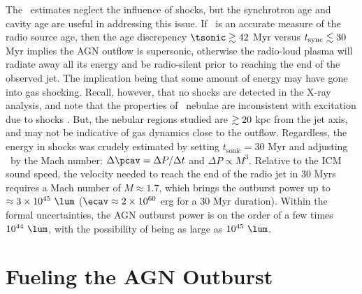 \documentclass[useAMS,usenatbib]{mn2e}
\begin{document}
The \pcav\ estimates neglect the influence of shocks, but the
synchrotron age and cavity age are useful in addressing this issue. If
\tsync\ is an accurate measure of the radio source age, then the age
discrepency $\tsonic \ga 42$ Myr versus $t_{\mathrm{sync}} \lesssim 30$ Myr implies
the AGN outflow is supersonic, otherwise the radio-loud plasma will
radiate away all its energy and be radio-silent prior to reaching the
end of the observed jet. The implication being that some amount of
energy may have gone into gas shocking. Recall, however, that no
shocks are detected in the X-ray analysis, and note that the
properties of \irs\ nebulae are inconsistent with excitation due to
shocks \citep{1996MNRAS.283.1003C, 2000AJ....120..562T}. But, the
nebular regions studied are $\gtrsim 20$ kpc from the jet axis, and may
not be indicative of gas dynamics close to the outflow. Regardless,
the energy in shocks was crudely estimated by setting
$t_{\mathrm{sonic}} = 30$ Myr and adjusting \pcav\ by the Mach number:
$\Delta \pcav = \Delta P / \Delta t$ and $\Delta P \propto
M^3$. Relative to the ICM sound speed, the velocity needed to reach
the end of the radio jet in 30 Myrs requires a Mach number of $M
\approx 1.7$, which brings the outburst power up to $\approx 3 \times
10^{45} ~\lum$ ($\ecav \approx 2 \times 10^{60}$ erg for a 30 Myr
duration). Within the formal uncertainties, the AGN outburst power is
on the order of a few times $10^{44} ~\lum$, with the possibility of
being as large as $10^{45} ~\lum$.

\section{Fueling the AGN Outburst}
\label{sec:fuel}
\end{document}

